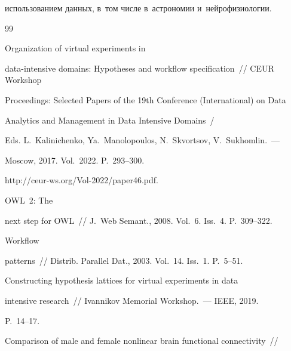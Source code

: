 использованием данных, в~том числе в~астрономии и~нейрофизиологии.





{\small\frenchspacing


{%




\begin{thebibliography}{99}







 Organization of virtual experiments in  


data-intensive domains: Hypotheses and workflow specification~/\!\!/ CEUR Workshop 


Proceedings:  Selected Papers of the 19th Conference (International) on Data 


Analytics and Management in Data Intensive Domains~/


Eds. L.~Kalinichenko, Ya.~Manolopoulos, N.~Skvortsov, V.~Sukhomlin.~---


Moscow,   2017. Vol.~2022. P.~293--300.


{\sf http://ceur-ws.org/Vol-2022/paper46.pdf}.




 OWL~2: The 


next step for OWL~/\!\!/ J.~Web Semant., 2008. Vol.~6. Iss.~4. P.~309--322.




 Workflow 


patterns~/\!\!/ Distrib. Parallel Dat., 2003. Vol.~14. Iss.~1. P.~5--51.




 Constructing hypothesis lattices for virtual experiments in data 


intensive research~/\!\!/ Ivannikov Memorial Workshop.~--- IEEE, 2019. 


P.~14--17.




 Comparison of male and female nonlinear brain functional connectivity~/\!\!/ 



\end{thebibliography}}}
